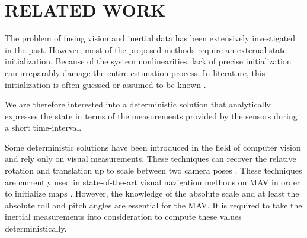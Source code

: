 \documentclass[letterpaper, 10 pt, conference]{ieeeconf}  %
\begin{document}

\section{RELATED WORK}

The problem of fusing vision and inertial data has been extensively investigated in the past.
However, most of the proposed methods require an external state initialization.
Because of the system nonlinearities, lack of precise initialization can irreparably damage the entire estimation process.
In literature, this initialization is often guessed or assumed to be known \cite{Armesto2007}\cite{Li2013}\cite{Huang2009}\cite{Bibuli2007}\cite{Forster2014}.

We are therefore interested into a deterministic solution that analytically expresses the state in terms of the measurements provided by the sensors during a short time-interval.

Some deterministic solutions have been introduced in the field of computer vision and rely only on visual measurements.
These techniques can recover the relative rotation and translation up to scale between two camera poses \cite{Longuet-Higgins1981}\cite{Hartley1997}\cite{Nister2003}\cite{Hartley2004}\cite{Li2006}.
These techniques are currently used in state-of-the-art visual navigation methods on MAV in order to initialize maps \cite{Weiss2012}\cite{Forster2014}.
However, the knowledge of the absolute scale and at least the absolute roll and pitch angles are essential for the MAV.
It is required to take the inertial measurements into consideration to compute these values deterministically.

\end{document}
